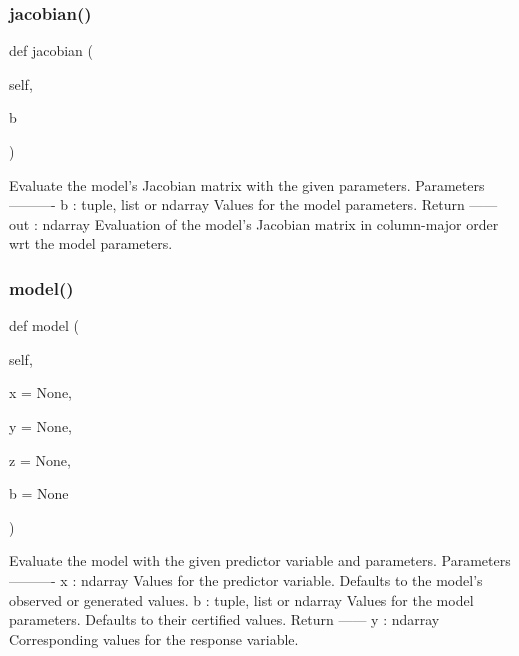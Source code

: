 \subsubsection{\texorpdfstring{jacobian()}{jacobian()}}
{\footnotesize\ttfamily def jacobian (\begin{DoxyParamCaption}\item[{}]{self,  }\item[{}]{b }\end{DoxyParamCaption})}

\begin{DoxyVerb}Evaluate the model's Jacobian matrix with the given parameters.
Parameters
----------
b : tuple, list or ndarray
    Values for the model parameters.
Return
------
out : ndarray
    Evaluation of the model's Jacobian matrix in column-major order wrt
    the model parameters.
\end{DoxyVerb}
 \mbox{\label{class_gauss_newton_1_1_g_ndataset_ac19fa38fbddb146e4803a28f9a0ddcf2}} 
\subsubsection{\texorpdfstring{model()}{model()}}
{\footnotesize\ttfamily def model (\begin{DoxyParamCaption}\item[{}]{self,  }\item[{}]{x = {\ttfamily None},  }\item[{}]{y = {\ttfamily None},  }\item[{}]{z = {\ttfamily None},  }\item[{}]{b = {\ttfamily None} }\end{DoxyParamCaption})}

\begin{DoxyVerb}Evaluate the model with the given predictor variable and parameters.
Parameters
----------
x : ndarray
    Values for the predictor variable. Defaults to the model's observed
    or generated values.
b : tuple, list or ndarray
    Values for the model parameters. Defaults to their certified values.
Return
------
y : ndarray
    Corresponding values for the response variable.
\end{DoxyVerb}
 \mbox{\label{class_gauss_newton_1_1_g_ndataset_a5127ea775c557e887e1ef8172a5f5d39}} 
